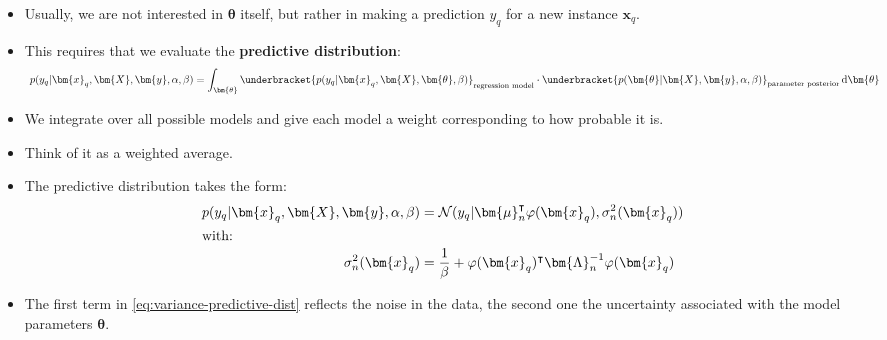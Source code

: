 \begin{frame}
	\begin{itemize}
		\item Usually, we are not interested in $\bm{\theta}$ itself, but rather in making a prediction $y_q$ for a new instance $\bm{x}_q$.
		\item This requires that we evaluate the \textbf{predictive distribution}:
		\begin{equation}
			p(y_q \vert \bm{x}_q, \bm{X}, \bm{y}, \alpha, \beta) = \int_{\bm{\theta}} \underbracket{p(y_q \vert \bm{x}_q, \bm{X}, \bm{\theta}, \beta)}_{\text{regression model}} \cdot
				\underbracket{p(\bm{\theta} \vert \bm{X}, \bm{y}, \alpha, \beta)}_{\text{parameter posterior}} \diff \bm{\theta}
		\end{equation}
		\item We integrate over all possible models and give each model a weight corresponding to how probable it is.
		\item Think of it as a weighted average.
		\item The predictive distribution takes the form:
		\begin{align}
			p(y_q \vert \bm{x}_q, \bm{X}, \bm{y}, \alpha, \beta)
				&= \mathcal{N}(y_q \vert \bm{\mu}_n^{\intercal} \varphi(\bm{x}_q), \sigma_n^2(\bm{x}_q)) \\
			\shortintertext{with:}
			\sigma_n^2(\bm{x}_q)
				&= \frac{1}{\beta} + \varphi(\bm{x}_q)^{\intercal} \bm{\Lambda}_n^{-1} \varphi(\bm{x}_q)
				\label{eq:variance-predictive-dist}
		\end{align}
		\item The first term in \cref{eq:variance-predictive-dist} reflects the noise in the data, the second one the uncertainty associated with the model parameters $\bm{\theta}$.
	\end{itemize}
\end{frame}


\begin{frame}
\end{frame}


